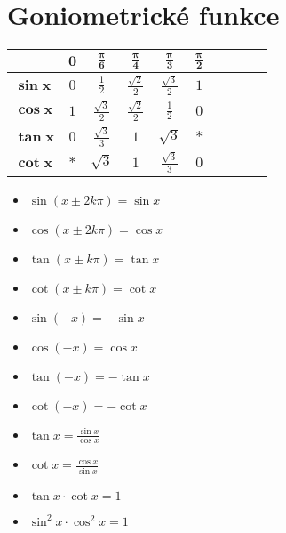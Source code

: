 \documentclass{article}
\newcommand{\mbf}[1]{\mathbf{#1}}
\begin{document}
	\section*{Goniometrické funkce}
	\begin{multicols}{4}
		\begingroup
			\centering
			\renewcommand{\arraystretch}{1.55}
			\begin{tabular}{p{1.5em}|ccccccccc}
												&	$\mbf{0}$	&	$\mbf{\frac{\pi}{6}}$	&	$\mbf{\frac{\pi}{4}}$	&	$\mbf{\frac{\pi}{3}}$	&	$\mbf{\frac{\pi}{2}}$	\\\hline
				$\mbf{\sin{x}}$	&	$0$				&	$\frac{1}{2}$					&	$\frac{\sqrt{2}}{2}$	&	$\frac{\sqrt{3}}{2}$	&	$1$										\\
				$\mbf{\cos{x}}$	&	$1$				&	$\frac{\sqrt{3}}{2}$	&	$\frac{\sqrt{2}}{2}$	&	$\frac{1}{2}$					&	$0$										\\
				$\mbf{\tan{x}}$	&	$0$				&	$\frac{\sqrt{3}}{3}$	&	$1$										&	$\sqrt{3}$						&	$*$										\\
				$\mbf{\cot{x}}$	&	$*$				&	$\sqrt{3}$						&	$1$										&	$\frac{\sqrt{3}}{3}$	&	$0$										\\
			\end{tabular}
		\endgroup
		\columnbreak
		\begin{itemize}
		\begingroup
			\item $\sin{(x \pm 2k\pi)} = \sin{x}$
			\item $\cos{(x \pm 2k\pi)} = \cos{x}$
			\item $\tan{(x \pm k\pi)} = \tan{x}$
			\item $\cot{(x \pm k\pi)} = \cot{x}$
		\columnbreak
			\item $\sin{(-x)} = -\sin{x}$
			\item $\cos{(-x)} = \cos{x}$
			\item $\tan{(-x)} = -\tan{x}$
			\item $\cot{(-x)} = -\cot{x}$
		\columnbreak
			\item $\tan{x} = \frac{\sin{x}}{\cos{x}}$
			\item $\cot{x} = \frac{\cos{x}}{\sin{x}}$
			\item $\tan{x} \cdot \cot{x} = 1$
			\item $\sin^{2}{x} \cdot \cos^{2}{x} = 1$
		\endgroup
		\end{itemize}
	\end{multicols}
\end{document}
